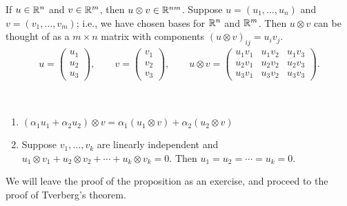 If $u\in \mathbb{R}^n$ and $v\in \mathbb{R}^m$, then $u\otimes v \in \mathbb{R}^{nm}$. Suppose $u = (u_1,\dotsc,u_n)$ and $v = (v_1,\dotsc,v_m)$; i.e., we have chosen bases for $\mathbb{R}^n$ and $\mathbb{R}^m$. Then $u\otimes v $ can be thought of as a $m\times n$ matrix with components $(u\otimes v)_{ij} = u_i v_j$.
\begin{align*}	
u = \begin{pmatrix}
u_1\\ u_2\\ u_3
\end{pmatrix}, \qquad v = \begin{pmatrix}
v_1 \\ v_2 \\ v_3
\end{pmatrix}, \qquad u\otimes v = \begin{pmatrix}
u_1 v_1 & u_1 v_2 & u_1 v_3\\
u_2 v_1 & u_2 v_2 & u_2 v_3 \\
u_3 v_1 & u_3 v_2 & u_3 v_3
\end{pmatrix}.
\end{align*}

\begin{proposition}
~\begin{enumerate}
\item $(\alpha_1 u_1 + \alpha_2 u_2) \otimes v = \alpha_1 (u_1\otimes v) + \alpha_2 (u_2\otimes v)$
\item  Suppose $v_1,\dotsc,v_k$ are linearly independent and $u_1\otimes v_1 + u_2\otimes v_2 + \dotsm + u_k \otimes v_k = 0$. Then $u_1 = u_2 = \dotsm = u_k = 0$.
\end{enumerate}
\end{proposition}
We will leave the proof of the proposition as an exercise, and proceed to the proof of Tverberg's theorem.

